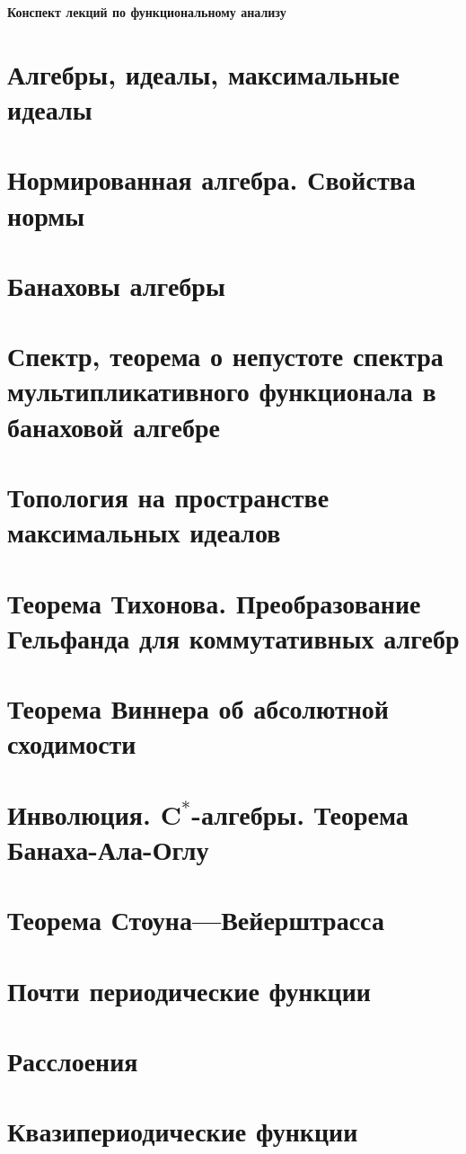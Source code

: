\documentclass[a4paper,12pt]{extarticle}
\theoremstyle{definition}
\begin{document}
    \begin{titlepage}
        \vfill
        \centering\Huge\bfseries Конспект лекций по функциональному анализу
        \vfill
    \end{titlepage}
    \tableofcontents
    \section{Алгебры, идеалы, максимальные идеалы}

    \section{Нормированная алгебра. Свойства нормы}

    \section{Банаховы алгебры}

    \section{Спектр, теорема о непустоте спектра мультипликативного функционала в банаховой алгебре}

    \section{Топология на пространстве максимальных идеалов}

    \section{Теорема Тихонова. Преобразование Гельфанда для коммутативных алгебр}

    \section{Теорема Виннера об абсолютной сходимости}

    \section{Инволюция. $\mathbf{C^*}$-алгебры. Теорема Банаха-Ала-Оглу}

    \section{Теорема Стоуна---Вейерштрасса}

    \section{Почти периодические функции}

    \section{Расслоения}

    \section{Квазипериодические функции}
\end{document}
